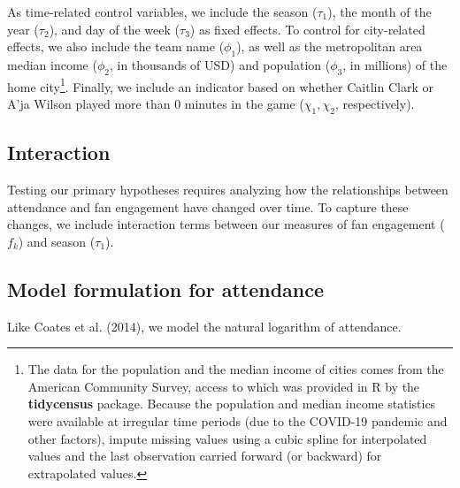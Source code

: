 \documentclass[
  letterpaper,
  DIV=11,
  numbers=noendperiod]{scrartcl}
\begin{document}
As time-related control variables, we include the season (\(\tau_1\)),
the month of the year (\(\tau_2\)), and day of the week (\(\tau_3\)) as
fixed effects. To control for city-related effects, we also include the
team name (\(\phi_1\)), as well as the metropolitan area median income
(\(\phi_2\), in thousands of USD) and population (\(\phi_3\), in
millions) of the home city\footnote{The data for the population and the
  median income of cities comes from the American Community Survey,
  access to which was provided in R by the \textbf{tidycensus} package.
  Because the population and median income statistics were available at
  irregular time periods (due to the COVID-19 pandemic and other
  factors), impute missing values using a cubic spline for interpolated
  values and the last observation carried forward (or backward) for
  extrapolated values.}. Finally, we include an indicator based on
whether Caitlin Clark or A'ja Wilson played more than 0 minutes in the
game (\(\chi_1, \chi_2\), respectively).

\subsection{Interaction}\label{interaction}

Testing our primary hypotheses requires analyzing how the relationships
between attendance and fan engagement have changed over time. To capture
these changes, we include interaction terms between our measures of fan
engagement (\(f_k\)) and season (\(\tau_1\)).

\subsection{Model formulation for attendance}\label{sec-mod-attend}

Like Coates et al. (2014), we model the natural logarithm of attendance.
\end{document}

